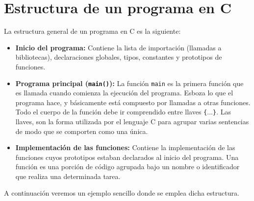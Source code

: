 \section{Estructura de un programa en C}
La estructura general de un programa en C es la siguiente:
\begin{itemize}
	\item \textbf{Inicio del programa:} Contiene la lista de importación (llamadas a bibliotecas), declaraciones globales, tipos, constantes y prototipos de funciones.
	\item \textbf{Programa principal (\texttt{main()}):} La función \texttt{main} es la primera función que es llamada cuando comienza la ejecución del programa. Esboza lo que el programa hace, y básicamente está compuesto por llamadas a otras funciones. Todo el cuerpo de la función debe ir comprendido entre llaves \texttt{\{}...\texttt{\}}. Las llaves, son la forma utilizada por el lenguaje C para agrupar varias sentencias de modo que se comporten como una única.
	\item \textbf{Implementación de las funciones:} Contiene la implementación de las funciones cuyos prototipos estaban declarados al inicio del programa. Una función es una porción de código agrupada bajo un nombre o identificador que realiza una determinada tarea.
\end{itemize}
A continuación veremos un ejemplo sencillo donde se emplea dicha estructura.

